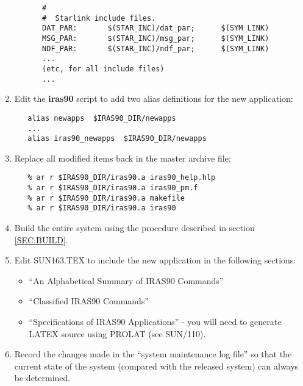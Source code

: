 \begin{enumerate}
\begin{itemize}
\small
\begin{verbatim}
   #
   #  Starlink include files.
   DAT_PAR:       $(STAR_INC)/dat_par;      $(SYM_LINK)
   MSG_PAR:       $(STAR_INC)/msg_par;      $(SYM_LINK)
   NDF_PAR:       $(STAR_INC)/ndf_par;      $(SYM_LINK)
   ...
   (etc, for all include files)
   ...
\end{verbatim}
\normalsize

\end{itemize}

\item Edit the {\bf iras90} script to add two alias definitions for the new
application:

\small
\begin{verbatim}
   alias newapps  $IRAS90_DIR/newapps
   ...
   alias iras90_newapps  $IRAS90_DIR/newapps
\end{verbatim}
\normalsize

\item Replace all modified items back in the master archive file:

\small
\begin{verbatim}
   % ar r $IRAS90_DIR/iras90.a iras90_help.hlp
   % ar r $IRAS90_DIR/iras90.a iras90_pm.f
   % ar r $IRAS90_DIR/iras90.a makefile
   % ar r $IRAS90_DIR/iras90.a iras90
\end{verbatim}
\normalsize

\item Build the entire system using the procedure described in section
\ref{SEC:BUILD}.

\item Edit {\small SUN163.TEX} to include the new application in the following
sections:
\begin{itemize}
\item ``An Alphabetical Summary of {\small IRAS90} Commands''
\item ``Classified {\small IRAS90} Commands''
\item ``Specifications of {\small IRAS90} Applications'' - you will need to
generate {\small LATEX} source using {\small PROLAT} (see SUN/110).
\end{itemize}

\item Record the changes made in the ``system maintenance log file'' so that the
current state of the system (compared with the released system) can
always be determined.

\end{enumerate}

